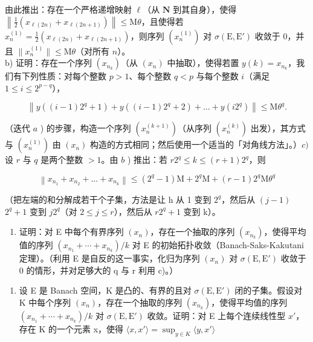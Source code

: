 由此推出：存在一个严格递增映射 \(\ell\)（从 \(\mathbf{N}\) 到其自身），使得 \(\left\| \frac{1}{2} (x_{\ell(2n)} + x_{\ell(2n+1)})\right\| \leqslant \mathrm{M}\theta\)，且使得若 \(x_{n}^{(1)} = \frac{1}{2} (x_{\ell(2n)} + x_{\ell(2n+1)})\)，则序列 \((x_{n}^{(1)})\) 对 \(\sigma(\mathrm{E},\mathrm{E}')\) 收敛于 0，并且 \(\| x_n^{(1)}\| \leqslant \mathrm{M}\theta\)（对所有 \(n\)）。\\
b) 证明：存在一个序列 \((x_{n_k})\)（从 \((x_{n})\) 中抽取），使得若置 \(y(k) = x_{n_k}\)，我们有下列性质：对每个整数 \(p > 1\)、每个整数 \(q < p\) 与每个整数 \(i\)（满足 \(1 \leqslant i \leqslant 2^{p - q}\)），

\[
\left\| y ((i - 1) 2 ^ {q} + 1) + y ((i - 1) 2 ^ {q} + 2) + \dots + y (i 2 ^ {q}) \right\| \leqslant \mathrm{M} \theta^ {q}.
\]

（迭代 \(a\) ) 的步骤，构造一个序列 \((x_{n}^{(k + 1)})\)（从序列 \((x_{n}^{(k)})\) 出发），其方式与 \((x_{n}^{(1)})\) 由 \((x_{n})\) 构造的方式相同；然后使用一个适当的「对角线方法」。）\(c)\) 设 \(r\) 与 \(q\) 是两个整数 \(>1\)。由 \(b\) ) 推出：若 \(r2^{q}\leqslant k\leqslant (r + 1)2^{q}\)，则

\[
\left\| x _ {n _ {1}} + x _ {n _ {2}} + \dots + x _ {n _ {k}} \right\| \leqslant (2 ^ {q} - 1) \mathrm{M} + 2 ^ {q} \mathrm{M} + (r - 1) 2 ^ {q} \mathrm{M} \theta^ {q}
\]

（把左端的和分解成若干个子集，方法是让 h 从 1 变到 \(2^{q}\)，然后从 \((j - 1)\) \(2^{q} + 1\) 变到 \(j2^{q}\)（对 \(2 \leqslant j \leqslant r\)），然后从 \(r2^{q} + 1\) 变到 k）。

\begin{enumerate}
\def\labelenumi{\alph{enumi})}
\setcounter{enumi}{3}
\tightlist
\item
  证明：对 E 中每个有界序列 \((x_{n})\)，存在一个抽取的序列 \((x_{n_{k}})\)，使得平均值的序列 \((x_{n_{1}} + \cdots + x_{n_{k}})/k\) 对 E 的初始拓扑收敛（Banach-Saks-Kakutani 定理）。（利用 E 是自反的这一事实，化归为序列 \((x_{n})\) 对 \(\sigma(\mathrm{E}, \mathrm{E}')\) 收敛于 0 的情形，并对足够大的 q 与 r 利用 c)。）
\end{enumerate}

\begin{enumerate}
\def\labelenumi{\arabic{enumi})}
\setcounter{enumi}{33}
\tightlist
\item
  设 E 是 Banach 空间，K 是凸的、有界的且对 \(\sigma(\mathrm{E},\mathrm{E}')\) 闭的子集。假设对 K 中每个序列 \((x_{n})\)，存在一个抽取的序列 \((x_{n_{k}})\)，使得平均值的序列 \((x_{n_{1}}+\cdots+x_{n_{k}})/k\) 对 \(\sigma(\mathrm{E},\mathrm{E}')\) 收敛。证明：对 E 上每个连续线性型 \(x'\)，存在 K 的一个元素 x，使得 \(\langle x,x'\rangle=\sup_{y\in K} \langle y,x'\rangle\)
\end{enumerate}

